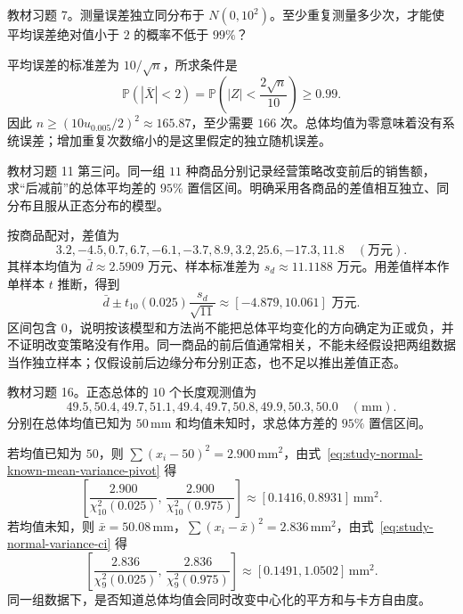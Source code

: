 \begin{example}
\label{ex:study-ci-exercise-measurements}
教材习题 7。测量误差独立同分布于 $N(0,10^2)$。至少重复测量多少次，才能使平均误差绝对值小于 $2$ 的概率不低于 $99\%$？
\end{example}
\begin{solve}
平均误差的标准差为 $10/\sqrt n$，所求条件是
\[
  \mathbb P(|\bar X|<2)
   =\mathbb P\left(|Z|<\frac{2\sqrt n}{10}\right)\ge0.99.
\]
因此 $n\ge(10u_{0.005}/2)^2\approx165.87$，至少需要 $166$ 次。总体均值为零意味着没有系统误差；增加重复次数缩小的是这里假定的独立随机误差。
\end{solve}

\begin{example}
\label{ex:study-ci-exercise-paired-sales}
教材习题 11 第三问。同一组 $11$ 种商品分别记录经营策略改变前后的销售额，求“后减前”的总体平均差的 $95\%$ 置信区间。明确采用各商品的差值相互独立、同分布且服从正态分布的模型。
\end{example}
\begin{solve}
按商品配对，差值为
\[
  3.2,-4.5,0.7,6.7,-6.1,-3.7,8.9,3.2,25.6,-17.3,11.8
  \quad(\text{万元}).
\]
其样本均值为 $\bar d\approx2.5909$ 万元、样本标准差为 $s_d\approx11.1188$ 万元。用差值样本作单样本 $t$ 推断，得到
\[
  \bar d\pm t_{10}(0.025)\frac{s_d}{\sqrt{11}}
  \approx[-4.879,10.061]\text{ 万元}.
\]
区间包含 $0$，说明按该模型和方法尚不能把总体平均变化的方向确定为正或负，并不证明改变策略没有作用。同一商品的前后值通常相关，不能未经假设把两组数据当作独立样本；仅假设前后边缘分布分别正态，也不足以推出差值正态。
\end{solve}

\begin{example}
\label{ex:study-ci-exercise-variance-df}
教材习题 16。正态总体的 $10$ 个长度观测值为
\[
  49.5,50.4,49.7,51.1,49.4,49.7,50.8,49.9,50.3,50.0
  \quad(\mathrm{mm}).
\]
分别在总体均值已知为 $50\,\mathrm{mm}$ 和均值未知时，求总体方差的 $95\%$ 置信区间。
\end{example}
\begin{solve}
若均值已知为 $50$，则 $\sum(x_i-50)^2=2.900\,\mathrm{mm}^2$，由式~\eqref{eq:study-normal-known-mean-variance-pivot} 得
\[
  \left[\frac{2.900}{\chi_{10}^2(0.025)},\,
        \frac{2.900}{\chi_{10}^2(0.975)}\right]
  \approx[0.1416,0.8931]\,\mathrm{mm}^2.
\]
若均值未知，则 $\bar x=50.08\,\mathrm{mm}$，$\sum(x_i-\bar x)^2=2.836\,\mathrm{mm}^2$，由式~\eqref{eq:study-normal-variance-ci} 得
\[
  \left[\frac{2.836}{\chi_9^2(0.025)},\,
        \frac{2.836}{\chi_9^2(0.975)}\right]
  \approx[0.1491,1.0502]\,\mathrm{mm}^2.
\]
同一组数据下，是否知道总体均值会同时改变中心化的平方和与卡方自由度。
\end{solve}

